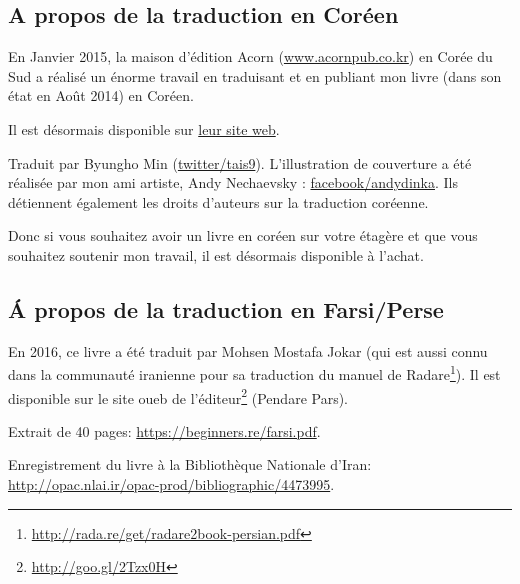 



\subsection*{A propos de la traduction en Coréen}

En Janvier 2015, la maison d'édition Acorn (\href{http://www.acornpub.co.kr}{www.acornpub.co.kr}) en Corée du Sud a réalisé un énorme travail en traduisant et en publiant mon livre (dans son état en Août 2014) en Coréen.

Il est désormais disponible sur \href{http://go.yurichev.com/17343}{leur site web}.

\iffalse
\begin{figure}[H]
\centering
\texttt{[image: acorn\_cover.jpg]}
\end{figure}
\fi

Traduit par Byungho Min (\href{http://go.yurichev.com/17344}{twitter/tais9}).
L'illustration de couverture a été réalisée par mon ami artiste, Andy Nechaevsky :
\href{http://go.yurichev.com/17023}{facebook/andydinka}.
Ils détiennent également les droits d'auteurs sur la traduction coréenne.

Donc si vous souhaitez avoir un livre  en coréen sur votre étagère et que vous souhaitez soutenir mon travail, il est désormais disponible à l'achat.

\subsection*{Á propos de la traduction en Farsi/Perse}

En 2016, ce livre a été traduit par Mohsen Mostafa Jokar (qui est aussi connu dans
la communauté iranienne pour sa traduction du manuel de Radare\footnote{\url{http://rada.re/get/radare2book-persian.pdf}}).
Il est disponible sur le site oueb de l'éditeur\footnote{\url{http://goo.gl/2Tzx0H}}
(Pendare Pars).

Extrait de 40 pages: \url{https://beginners.re/farsi.pdf}.

Enregistrement du livre à la Bibliothèque Nationale d'Iran: \url{http://opac.nlai.ir/opac-prod/bibliographic/4473995}.

